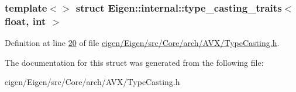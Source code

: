 \subsubsection*{template$<$$>$\newline
struct Eigen\+::internal\+::type\+\_\+casting\+\_\+traits$<$ float, int $>$}



Definition at line \hyperlink{eigen_2_eigen_2src_2_core_2arch_2_a_v_x_2_type_casting_8h_source_l00020}{20} of file \hyperlink{eigen_2_eigen_2src_2_core_2arch_2_a_v_x_2_type_casting_8h_source}{eigen/\+Eigen/src/\+Core/arch/\+A\+V\+X/\+Type\+Casting.\+h}.



The documentation for this struct was generated from the following file\+:\begin{DoxyCompactItemize}
\item 
eigen/\+Eigen/src/\+Core/arch/\+A\+V\+X/\+Type\+Casting.\+h\end{DoxyCompactItemize}
